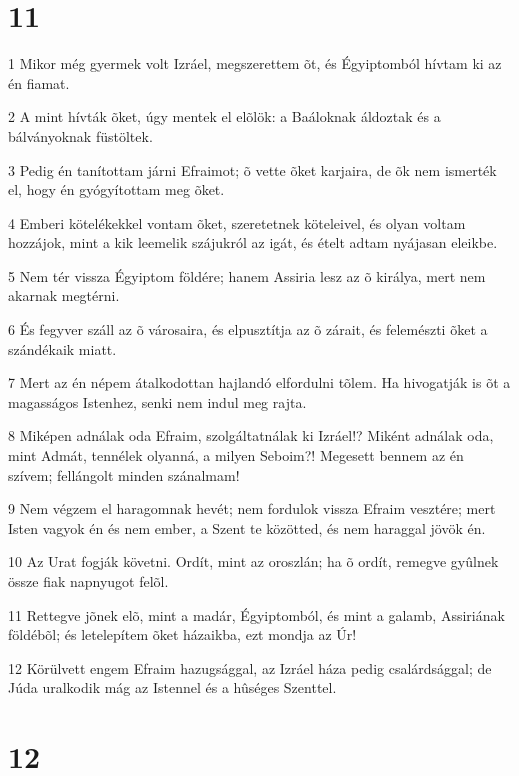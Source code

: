 \chapter{11}

\par 1 Mikor még gyermek volt Izráel, megszerettem õt, és Égyiptomból hívtam  ki az én fiamat.
\par 2 A mint hívták õket, úgy mentek el elõlök: a Baáloknak áldoztak és a bálványoknak füstöltek.
\par 3 Pedig én tanítottam járni Efraimot; õ vette õket karjaira, de õk nem ismerték el, hogy én gyógyítottam meg õket.
\par 4 Emberi kötelékekkel vontam õket, szeretetnek köteleivel, és olyan voltam hozzájok, mint a kik leemelik szájukról az igát, és ételt adtam nyájasan eleikbe.
\par 5 Nem tér vissza Égyiptom földére; hanem Assiria lesz az õ királya, mert nem akarnak megtérni.
\par 6 És fegyver száll az õ városaira, és elpusztítja az õ zárait, és felemészti õket a szándékaik miatt.
\par 7 Mert az én népem átalkodottan hajlandó elfordulni tõlem. Ha hivogatják is õt a magasságos Istenhez, senki nem indul meg rajta.
\par 8 Miképen adnálak oda Efraim, szolgáltatnálak ki Izráel!? Miként adnálak oda, mint Admát, tennélek olyanná, a milyen Seboim?! Megesett bennem az én szívem; fellángolt minden szánalmam!
\par 9 Nem végzem el haragomnak hevét; nem fordulok vissza Efraim vesztére; mert Isten vagyok én és nem ember, a Szent te közötted, és nem haraggal jövök én.
\par 10 Az Urat fogják követni. Ordít, mint az oroszlán; ha õ ordít, remegve gyûlnek össze fiak napnyugot felõl.
\par 11 Rettegve jõnek elõ, mint a madár, Égyiptomból, és mint a galamb, Assiriának földébõl; és letelepítem õket házaikba, ezt mondja az Úr!
\par 12 Körülvett engem Efraim hazugsággal, az Izráel háza pedig csalárdsággal; de Júda uralkodik mág az Istennel és a hûséges  Szenttel.

\chapter{12}

